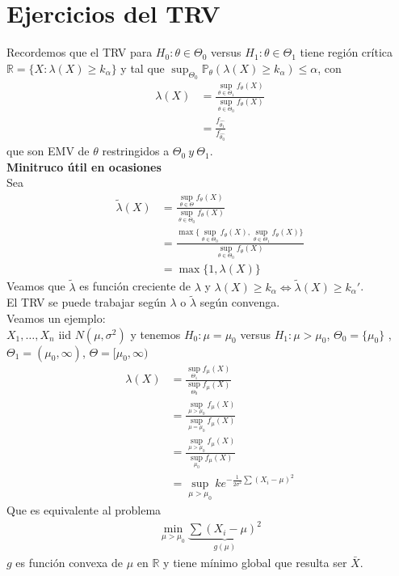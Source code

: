\documentclass[10pt]{article}
\theoremstyle{plain}
\theoremstyle{definition}
\begin{document}
\section{Ejercicios del TRV}
Recordemos que el TRV para $H_{0}: \theta \in \Theta_{0}$ versus $H_{1}: \theta \in \Theta_{1}$ tiene región crítica $\mathbb{R}=\{X \colon \lambda(X) \ge k_{\alpha}\}$ y tal que $\sup_{\Theta_{0}}\mathbb{P}_{\theta}(\lambda(X) \ge k_{\alpha})\le \alpha$, con 
\begin{align*}
\lambda(X) &= \frac{\sup_{\theta \in \Theta_{1}}f_{\theta}(X)}{\sup_{\theta \in \Theta_{0}}f_{\theta}(X)}\\
&= \frac{f_{\hat{\theta_{1}}}}{f_{\hat{\theta_{0}}}}
\end{align*}
que son EMV de $\theta$ restringidos a $\Theta_{0}\ y\ \Theta_{1}$.\\
\textbf{Minitruco útil en ocasiones}\\

Sea
\begin{align*}
\tilde{\lambda}(X) &= \frac{\sup_{\theta \in \Theta}f_{\theta}(X)}{\sup_{\theta \in \Theta_{0}}f_{\theta}(X)}\\
&= \frac{\max\{\sup_{\theta \in \Theta_{0}}f_{\theta}(X),\sup_{\theta \in \Theta_{1}}f_{\theta}(X)\}}{\sup_{\theta \in \Theta_{0}}f_{\theta}(X)}\\
&= \max\{1,\lambda(X)\}
\end{align*}
Veamos que $\tilde{\lambda}$ es función creciente de $\lambda$ y $\lambda(X) \ge k_{\alpha} \Leftrightarrow \tilde{\lambda}(X) \ge k_{\alpha}'$.\\
El TRV se puede trabajar según $\lambda$ o $\tilde{\lambda}$ según convenga.\\

Veamos un ejemplo:\\
$X_{1},\ldots,X_{n}$ iid $N(\mu,\sigma^2)$ y tenemos $H_{0}: \mu=\mu_{0}$ versus $H_{1}: \mu > \mu_{0}$, $\Theta_{0}=\{\mu_{0}\}$ , $\Theta_{1}=(\mu_{0},\infty)$, $\Theta = [\mu_{0},\infty)$
\begin{align*}
\lambda(X) &= \frac{\sup_{\Theta_{1}}f_{\mu}(X)}{\sup_{\Theta_{0}}f_{\mu}(X)}\\
&= \frac{\sup_{\mu>\mu_{0}}f_{\mu}(X)}{\sup_{\mu =\mu_{0}}f_{\mu}(X)}\\
&= \frac{\sup_{\mu>\mu_{0}}f_{\mu}(X)}{\sup_{\mu_{0}}f_{\mu}(X)}\\
&= \sup_{\mu > \mu_{0}} k e^{-\frac{1}{2\sigma^2}\sum(X_{i}-\mu)^2}
\end{align*}
Que es equivalente al problema
\begin{align*}
\min_{\mu>\mu_{0}} \underbrace{\sum(X_{i}-\mu)^2}_{g(\mu)}
\end{align*}
$g$ es función convexa de $\mu$ en $\mathbb{R}$ y tiene mínimo global que resulta ser $\bar{X}$.\\
\end{document}
